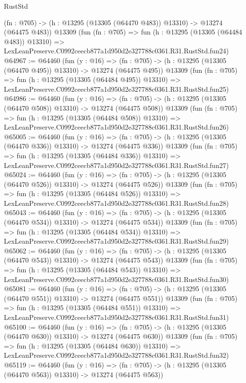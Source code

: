 \begin{lexlean}{RustStd}
\begin{coremodule}
    (fn : @705) -> (h : @13295 (@13305 (@64470 @483)) @13310) -> @13274 (@64475 @483))
    @13309
    (fun (fn : @705) =>
    fun (h : @13295 (@13305 (@64484 @483)) @13310) =>
    LexLeanPreserve.C0992ceecb877a1d950d2e327788c0361.R31.RustStd.fun24)
@64967 := @64460
    (fun (y : @16) =>
    (fn : @705) -> (h : @13295 (@13305 (@64470 @495)) @13310) -> @13274 (@64475 @495))
    @13309
    (fun (fn : @705) =>
    fun (h : @13295 (@13305 (@64484 @495)) @13310) =>
    LexLeanPreserve.C0992ceecb877a1d950d2e327788c0361.R31.RustStd.fun25)
@64986 := @64460
    (fun (y : @16) =>
    (fn : @705) -> (h : @13295 (@13305 (@64470 @508)) @13310) -> @13274 (@64475 @508))
    @13309
    (fun (fn : @705) =>
    fun (h : @13295 (@13305 (@64484 @508)) @13310) =>
    LexLeanPreserve.C0992ceecb877a1d950d2e327788c0361.R31.RustStd.fun26)
@65005 := @64460
    (fun (y : @16) =>
    (fn : @705) -> (h : @13295 (@13305 (@64470 @336)) @13310) -> @13274 (@64475 @336))
    @13309
    (fun (fn : @705) =>
    fun (h : @13295 (@13305 (@64484 @336)) @13310) =>
    LexLeanPreserve.C0992ceecb877a1d950d2e327788c0361.R31.RustStd.fun27)
@65024 := @64460
    (fun (y : @16) =>
    (fn : @705) -> (h : @13295 (@13305 (@64470 @526)) @13310) -> @13274 (@64475 @526))
    @13309
    (fun (fn : @705) =>
    fun (h : @13295 (@13305 (@64484 @526)) @13310) =>
    LexLeanPreserve.C0992ceecb877a1d950d2e327788c0361.R31.RustStd.fun28)
@65043 := @64460
    (fun (y : @16) =>
    (fn : @705) -> (h : @13295 (@13305 (@64470 @534)) @13310) -> @13274 (@64475 @534))
    @13309
    (fun (fn : @705) =>
    fun (h : @13295 (@13305 (@64484 @534)) @13310) =>
    LexLeanPreserve.C0992ceecb877a1d950d2e327788c0361.R31.RustStd.fun29)
@65062 := @64460
    (fun (y : @16) =>
    (fn : @705) -> (h : @13295 (@13305 (@64470 @543)) @13310) -> @13274 (@64475 @543))
    @13309
    (fun (fn : @705) =>
    fun (h : @13295 (@13305 (@64484 @543)) @13310) =>
    LexLeanPreserve.C0992ceecb877a1d950d2e327788c0361.R31.RustStd.fun30)
@65081 := @64460
    (fun (y : @16) =>
    (fn : @705) -> (h : @13295 (@13305 (@64470 @551)) @13310) -> @13274 (@64475 @551))
    @13309
    (fun (fn : @705) =>
    fun (h : @13295 (@13305 (@64484 @551)) @13310) =>
    LexLeanPreserve.C0992ceecb877a1d950d2e327788c0361.R31.RustStd.fun31)
@65100 := @64460
    (fun (y : @16) =>
    (fn : @705) -> (h : @13295 (@13305 (@64470 @630)) @13310) -> @13274 (@64475 @630))
    @13309
    (fun (fn : @705) =>
    fun (h : @13295 (@13305 (@64484 @630)) @13310) =>
    LexLeanPreserve.C0992ceecb877a1d950d2e327788c0361.R31.RustStd.fun32)
@65119 := @64460
    (fun (y : @16) =>
    (fn : @705) -> (h : @13295 (@13305 (@64470 @563)) @13310) -> @13274 (@64475 @563))

\end{coremodule}
\end{lexlean}

